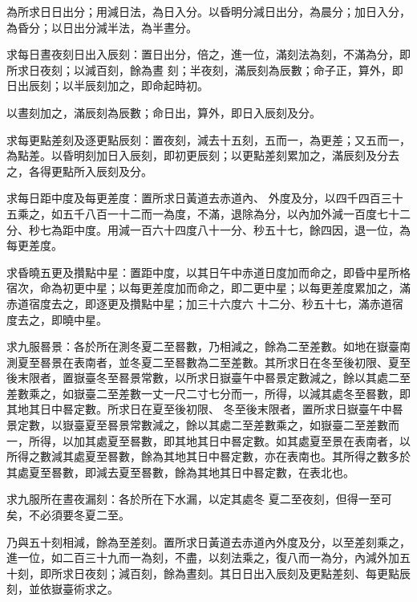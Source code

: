 \begin{pinyinscope}
 為所求日日出分；用減日法，為日入分。以昏明分減日出分，為晨分；加日入分，為昏分；以日出分減半法，為半晝分。



 求每日晝夜刻日出入辰刻：置日出分，倍之，進一位，滿刻法為刻，不滿為分，即所求日夜刻；以減百刻，餘為晝
 刻；半夜刻，滿辰刻為辰數；命子正，算外，即日出辰刻；以半辰刻加之，即命起時初。



 以晝刻加之，滿辰刻為辰數；命日出，算外，即日入辰刻及分。



 求每更點差刻及逐更點辰刻：置夜刻，減去十五刻，五而一，為更差；又五而一，為點差。以昏明刻加日入辰刻，即初更辰刻；以更點差刻累加之，滿辰刻及分去之，各得更點所入辰刻及分。



 求每日距中度及每更差度：置所求日黃道去赤道內、
 外度及分，以四千四百三十五乘之，如五千八百一十二而一為度，不滿，退除為分，以內加外減一百度七十二分、秒七為距中度。用減一百六十四度八十一分、秒五十七，餘四因，退一位，為每更差度。



 求昏曉五更及攢點中星：置距中度，以其日午中赤道日度加而命之，即昏中星所格宿次，命為初更中星；以每更差度加而命之，即二更中星；以每更差度累加之，滿赤道宿度去之，即逐更及攢點中星；加三十六度六
 十二分、秒五十七，滿赤道宿度去之，即曉中星。



 求九服晷景：各於所在測冬夏二至晷數，乃相減之，餘為二至差數。如地在嶽臺南測夏至晷景在表南者，並冬夏二至晷數為二至差數。其所求日在冬至後初限、夏至後末限者，置嶽臺冬至晷景常數，以所求日嶽臺午中晷景定數減之，餘以其處二至差數乘之，如嶽臺二至差數一丈一尺二寸七分而一，所得，以減其處冬至晷數，即其地其日中晷定數。所求日在夏至後初限、
 冬至後末限者，置所求日嶽臺午中晷景定數，以嶽臺夏至晷景常數減之，餘以其處二至差數乘之，如嶽臺二至差數而一，所得，以加其處夏至晷數，即其地其日中晷定數。如其處夏至景在表南者，以所得之數減其處夏至晷數，餘為其地其日中晷定數，亦在表南也。其所得之數多於其處夏至晷數，即減去夏至晷數，餘為其地其日中晷定數，在表北也。



 求九服所在晝夜漏刻：各於所在下水漏，以定其處冬
 夏二至夜刻，但得一至可矣，不必須要冬夏二至。



 乃與五十刻相減，餘為至差刻。置所求日黃道去赤道內外度及分，以至差刻乘之，進一位，如二百三十九而一為刻，不盡，以刻法乘之，復八而一為分，內減外加五十刻，即所求日夜刻；減百刻，餘為晝刻。其日日出入辰刻及更點差刻、每更點辰刻，並依嶽臺術求之。




\end{pinyinscope}
